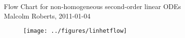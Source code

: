 \documentclass[12pt]{article}
\begin{document}
\pagestyle{empty}


\begin{center}
{\large  Flow Chart for non-homogeneous second-order linear ODEs}
\\
\vspace{0.3cm}
{\small Malcolm Roberts, 2011-01-04}
\end{center}
\vspace{1cm}


\begin{figure}[h]
  \centering
  \texttt{[image: ../figures/linhetflow]}
\end{figure}

 
\end{document}
